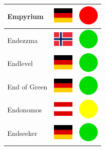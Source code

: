 \documentclass[12pt, a4paper, twoside]{report}
\begin{document}
\begin{center}
\begin{longtable}{|p{5cm}|p{2cm}|p{2cm}|}
 Empyrium                                                   & \includegraphics[width=1cm]{../img/flags/de} &   \includegraphics[width=1cm]{../likes/n} \\ \hline
 Endezzma                                                   & \includegraphics[width=1cm]{../img/flags/no} &   \includegraphics[width=1cm]{../likes/y} \\ \hline
 Endlevel                                                   & \includegraphics[width=1cm]{../img/flags/de} &   \includegraphics[width=1cm]{../likes/y} \\ \hline
 End of Green                                               & \includegraphics[width=1cm]{../img/flags/de} &   \includegraphics[width=1cm]{../likes/y} \\ \hline
 Endonomos                                                  & \includegraphics[width=1cm]{../img/flags/at} &   \includegraphics[width=1cm]{../likes/m} \\ \hline
 Endseeker                                                  & \includegraphics[width=1cm]{../img/flags/de} &   \includegraphics[width=1cm]{../likes/y} \\ \hline

\end{longtable}
\end{center}
\end{document}
